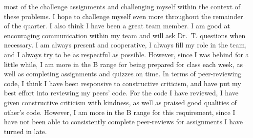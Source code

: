 \documentclass[
  letterpaper,
  DIV=11,
  numbers=noendperiod]{scrartcl}
\begin{document}
most of the challenge assignments and challenging myself within the
context of these problems. I hope to challenge myself even more
throughout the remainder of the quarter. I also think I have been a
great team member. I am good at encouraging communication within my team
and will ask Dr.~T. questions when necessary. I am always present and
cooperative, I always fill my role in the team, and I always try to be
as respectful as possible. However, since I was behind for a little
while, I am more in the B range for being prepared for class each week,
as well as completing assignments and quizzes on time. In terms of
peer-reviewing code, I think I have been responsive to constructive
criticism, and have put my best effort into reviewing my peers' code.
For the code I have reviewed, I have given constructive criticism with
kindness, as well as praised good qualities of other's code. However, I
am more in the B range for this requirement, since I have not been able
to consistently complete peer-reviews for assignments I have turned in
late.
\end{document}

